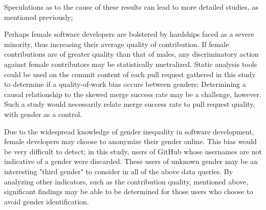 \documentclass{sigplanconf}
\begin{document}
Speculations as to the cause of these results can lead to more detailed studies,
as mentioned previously;

Perhaps female software developers are bolstered by hardships faced as a severe
minority, thus increasing their average quality of contribution. If female
contributions are of greater quality than that of males, any discriminatory
action against female contributors may be statistically nuetralized. Static
analysis tools could be used on the commit content of each pull request gathered
in this study to determine if a quality-of-work bias occurs between genders;
\cite{staticanalysis} Determining a causal relationship to the skewed merge success rate may be a
challenge, however. Such a study would necessarily relate merge success rate to
pull request quality, with gender as a control.

Due to the widespread knowledge of gender inequality in software development,
female developers may choose to anonymize their gender online. This bias would
be very difficult to detect; in this study, users of GitHub whose usernames are
not indicative of a gender were discarded. These users of unknown gender may be
an interesting "third gender" to consider in all of the above data queries. By
analyzing other indicators, such as the contribution quality, mentioned above,
significant findings may be able to be determined for those users who choose to
avoid gender identification.








\end{document}
